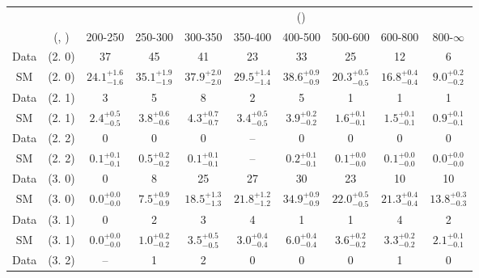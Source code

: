 \begin{table}[h!]
\tiny
\centering
{}
\begin{tabular}
{cccccccccc}
	\hline\hline
&	&	& \multicolumn{8}{c}{\scalht (\gev)}\\ 
	&	 (\njet, \nb) & 200-250 & 250-300 & 300-350 & 350-400 & 400-500 & 500-600 & 600-800 & 800-$\infty$ \\ [0.8ex] 
\hline
	Data & (2. 0) & 37 & 45 & 41 & 23 & 33 & 25 & 12 & 6 \\[0.5ex] 
	SM & (2. 0) & $24.1^{+ 1.6 }_{- 1.6 }$ & $35.1^{+ 1.9 }_{- 1.9 }$ & $37.9^{+ 2.0 }_{- 2.0 }$ & $29.5^{+ 1.4 }_{- 1.4 }$ & $38.6^{+ 0.9 }_{- 0.9 }$ & $20.3^{+ 0.5 }_{- 0.5 }$ & $16.8^{+ 0.4 }_{- 0.4 }$ & $9.0^{+ 0.2 }_{- 0.2 }$ \\[0.5ex] 
	Data & (2. 1) & 3 & 5 & 8 & 2 & 5 & 1 & 1 & 1 \\[0.5ex] 
	SM & (2. 1) & $2.4^{+ 0.5 }_{- 0.5 }$ & $3.8^{+ 0.6 }_{- 0.6 }$ & $4.3^{+ 0.7 }_{- 0.7 }$ & $3.4^{+ 0.5 }_{- 0.5 }$ & $3.9^{+ 0.2 }_{- 0.2 }$ & $1.6^{+ 0.1 }_{- 0.1 }$ & $1.5^{+ 0.1 }_{- 0.1 }$ & $0.9^{+ 0.1 }_{- 0.1 }$ \\[0.5ex] 
	Data & (2. 2) & 0 & 0 & 0 & -- & 0 & 0 & 0 & 0 \\[0.5ex] 
	SM & (2. 2) & $0.1^{+ 0.1 }_{- 0.1 }$ & $0.5^{+ 0.2 }_{- 0.2 }$ & $0.1^{+ 0.1 }_{- 0.1 }$ & -- & $0.2^{+ 0.1 }_{- 0.1 }$ & $0.1^{+ 0.0 }_{- 0.0 }$ & $0.1^{+ 0.0 }_{- 0.0 }$ & $0.0^{+ 0.0 }_{- 0.0 }$ \\[0.5ex] 
	Data & (3. 0) & 0 & 8 & 25 & 27 & 30 & 23 & 10 & 10 \\[0.5ex] 
	SM & (3. 0) & $0.0^{+ 0.0 }_{- 0.0 }$ & $7.5^{+ 0.9 }_{- 0.9 }$ & $18.5^{+ 1.3 }_{- 1.3 }$ & $21.8^{+ 1.2 }_{- 1.2 }$ & $34.9^{+ 0.9 }_{- 0.9 }$ & $22.0^{+ 0.5 }_{- 0.5 }$ & $21.3^{+ 0.4 }_{- 0.4 }$ & $13.8^{+ 0.3 }_{- 0.3 }$ \\[0.5ex] 
	Data & (3. 1) & 0 & 2 & 3 & 4 & 1 & 1 & 4 & 2 \\[0.5ex] 
	SM & (3. 1) & $0.0^{+ 0.0 }_{- 0.0 }$ & $1.0^{+ 0.2 }_{- 0.2 }$ & $3.5^{+ 0.5 }_{- 0.5 }$ & $3.0^{+ 0.4 }_{- 0.4 }$ & $6.0^{+ 0.4 }_{- 0.4 }$ & $3.6^{+ 0.2 }_{- 0.2 }$ & $3.3^{+ 0.2 }_{- 0.2 }$ & $2.1^{+ 0.1 }_{- 0.1 }$ \\[0.5ex] 
	Data & (3. 2) & -- & 1 & 2 & 0 & 0 & 0 & 1 & 0 \\[0.5ex] 

\end{tabular}
\end{table}
